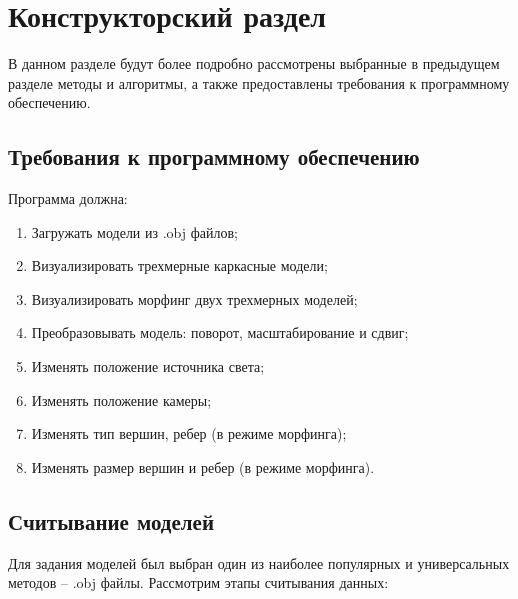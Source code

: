 \chapter{Конструкторский раздел}

В данном разделе будут более подробно рассмотрены выбранные в предыдущем разделе методы и алгоритмы, а также предоставлены требования к программному обеспечению.

\section{Требования к программному обеспечению}

Программа должна:
\begin{enumerate}
	\item Загружать модели из .obj файлов;
	\item Визуализировать трехмерные каркасные модели;
	\item Визуализировать морфинг двух трехмерных моделей;
	\item Преобразовывать модель: поворот, масштабирование и сдвиг;
	\item Изменять положение источника света;
	\item Изменять положение камеры;
	\item Изменять тип вершин, ребер (в режиме морфинга);
	\item Изменять размер вершин и ребер (в режиме морфинга).
\end{enumerate}


\section{Считывание моделей}

Для задания моделей был выбран один из наиболее популярных и универсальных методов – .obj файлы. 
Рассмотрим этапы считывания данных:

